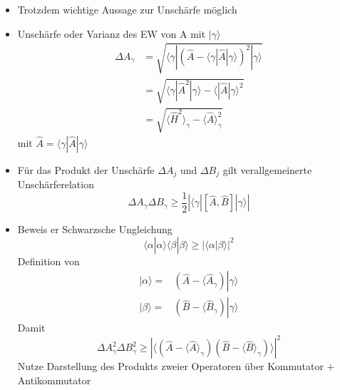 \documentclass[10pt,article,colorback,accentcolor=tud9d]{scrartcl}
\begin{document}
\begin{fleqn}
\begin{itemize}
    \item Trotzdem wichtige Aussage zur Unschärfe möglich
    \item Unschärfe oder Varianz des EW von A mit $\left.\right|\gamma\rangle$
      \begin{equation}
      \begin{aligned}
        \Delta A_\gamma&=\sqrt{\langle\gamma\left.\right|\left(\hat{A}-\langle\gamma\left|\hat{A}\right|\gamma\rangle\right)^2\left.\right|\gamma\rangle}\\
        &=\sqrt{\langle\gamma\left|\hat{A}^2\right|\gamma\rangle-\langle\left|\hat{A}\right|\gamma\rangle^2}\\
        &=\sqrt{\langle\hat{H}^2\rangle_\gamma-\langle\hat{A}\rangle_\gamma^2}
      \end{aligned}        
      \end{equation}
      mit $\hat{A}=\langle\gamma\left|\hat{A}\right|\gamma\rangle$
    \item Für das Produkt der Unschärfe $\Delta A_j$ und $\Delta B_j$ gilt verallgemeinerte Unschärferelation
      \begin{equation}
      \Delta A_\gamma \Delta B_\gamma \geq \frac{1}{2}\left|\langle\gamma\left|\left[ \hat{A},\hat{B}\right]\right|\gamma\rangle\right|
      \end{equation}
    \item Beweis er Schwarzsche Ungleichung
      \begin{equation}
      \langle\alpha\left.\right|\alpha\rangle\langle\beta\left.\right|\beta\rangle \geq \left|\langle\alpha\left|\right.\beta\rangle\right|^2
      \end{equation}
      Definition von 
      \begin{equation}
      \begin{aligned}
        \left.\right|\alpha\rangle=&\left(\hat{A}-\langle\hat{A}_\gamma\right)\left.\right|\gamma\rangle\\
        \left.\right|\beta\rangle=&\left(\hat{B}-\langle\hat{B}_\gamma\right)\left.\right|\gamma\rangle
      \end{aligned}
      \end{equation}
      Damit 
      \begin{equation}
      \Delta A_\gamma^2\Delta B_\gamma^2 \geq \left|\langle \left(\hat{A}-\langle\hat{A}\rangle_\gamma\right)\left(\hat{B}-\langle\hat{B}\rangle_\gamma\right)\rangle\right|^2
      \end{equation}
      Nutze Darstellung des Produkts zweier Operatoren über Kommutator $+$ Antikommutator

\end{itemize}
\end{fleqn}
\end{document}
